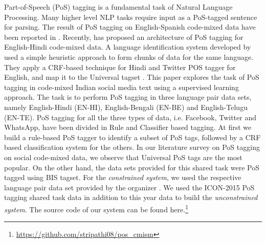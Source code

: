 \documentclass[11pt,a4paper]{article}
\begin{document}
Part-of-Speech (PoS) tagging is a fundamental task of Natural Language Processing.  Many higher level NLP tasks require input as a PoS-tagged sentence for parsing. The result of PoS tagging on English-Spanish code-mixed data have been reported in \cite{solorio2008part}. Recently, \cite{vyas2014pos} has proposed an architecture of PoS tagging for English-Hindi code-mixed data. A language identification system developed by \cite{gella2013query} used a simple heuristic approach to form chunks of data for the same language. They apply a CRF-based technique for Hindi and Twitter POS tagger \cite{owoputi2013improved} for English, and map it to the Universal tagset \cite{petrov2011universal}.
This paper explores the task of PoS tagging in code-mixed Indian social media text using a supervised learning approach. The task is to perform PoS tagging in three language pair data sets, namely English-Hindi (EN-HI), English-Bengali (EN-BE) and English-Telugu (EN-TE). PoS tagging for all the three types of data, i.e. Facebook, Twitter and WhatsApp, have been divided in Rule and Classifier based tagging.
At first we build a rule-based PoS tagger to identify a subset of PoS tags, followed by a CRF based classification system for the others. In our literature survey on PoS tagging on social code-mixed data, we observe that Universal PoS tags \cite{petrov2011universal} are the most popular. On the other hand, the data sets provided for this shared task were PoS tagged using BIS tagset\cite{jamatia2015part}. For the \textit{constrained system}, we used the respective language pair data set provided by the organizer \cite{POSicon2016}. We used the ICON-2015 PoS tagging shared task data in addition to this year data to build the \textit{unconstrained system}.
The source code of our system can be found here.\footnote{\url{https://github.com/stripathi08/pos_cmism}}
\end{document}
